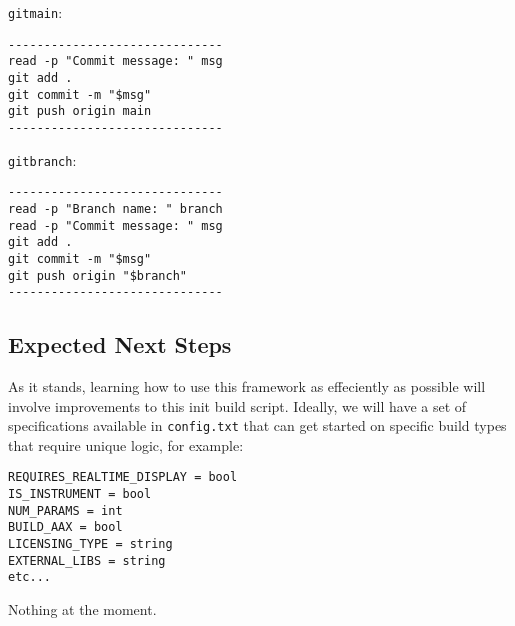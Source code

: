 \documentclass[twocolumn,natbib]{svjour3}        %
\begin{document}
\vspace{1em}

\texttt{gitmain}:
\begin{verbatim}
------------------------------
read -p "Commit message: " msg
git add .
git commit -m "$msg"
git push origin main
------------------------------
\end{verbatim}

\vspace{1em}

\texttt{gitbranch}:
\begin{verbatim}
------------------------------
read -p "Branch name: " branch
read -p "Commit message: " msg
git add .
git commit -m "$msg"
git push origin "$branch"
------------------------------
\end{verbatim}
\subsection{Expected Next Steps}
As it stands, learning how to use this framework as effeciently as possible will involve improvements to this init build script. Ideally, we will have a set of specifications available in \texttt{config.txt} that can get started on specific build types that require unique logic, for example:
\begin{verbatim}
REQUIRES_REALTIME_DISPLAY = bool
IS_INSTRUMENT = bool
NUM_PARAMS = int
BUILD_AAX = bool
LICENSING_TYPE = string
EXTERNAL_LIBS = string
etc...
\end{verbatim}




\phantom{.}

Nothing at the moment.
\end{document}
